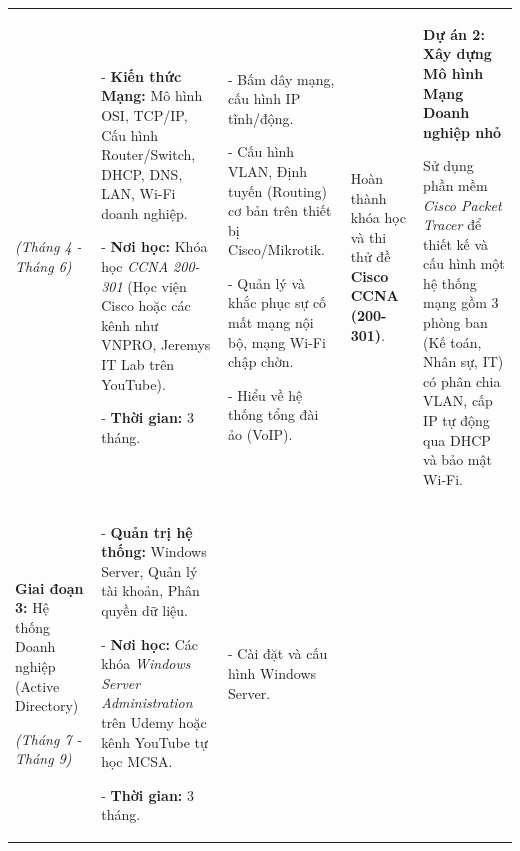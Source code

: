 \documentclass[
]{article}
\begin{document}
\begin{longtable}[]{@{}lllll@{}}
\begin{minipage}[t]{0.17\columnwidth}
\emph{(Tháng 4 - Tháng 6)}\strut
\end{minipage} & \begin{minipage}[t]{0.17\columnwidth}\raggedright
- \textbf{Kiến thức Mạng:} Mô hình OSI, TCP/IP, Cấu hình Router/Switch,
DHCP, DNS, LAN, Wi-Fi doanh nghiệp.

- \textbf{Nơi học:} Khóa học \emph{CCNA 200-301} (Học viện Cisco hoặc
các kênh như VNPRO, Jeremys IT Lab trên YouTube).

- \textbf{Thời gian:} 3 tháng.\strut
\end{minipage} & \begin{minipage}[t]{0.17\columnwidth}\raggedright
- Bấm dây mạng, cấu hình IP tĩnh/động.

- Cấu hình VLAN, Định tuyến (Routing) cơ bản trên thiết bị
Cisco/Mikrotik.

- Quản lý và khắc phục sự cố mất mạng nội bộ, mạng Wi-Fi chập chờn.

- Hiểu về hệ thống tổng đài ảo (VoIP).\strut
\end{minipage} & \begin{minipage}[t]{0.17\columnwidth}\raggedright
Hoàn thành khóa học và thi thử đề \textbf{Cisco CCNA (200-301)}.\strut
\end{minipage} & \begin{minipage}[t]{0.17\columnwidth}\raggedright
\textbf{Dự án 2: Xây dựng Mô hình Mạng Doanh nghiệp nhỏ}

Sử dụng phần mềm \emph{Cisco Packet Tracer} để thiết kế và cấu hình một
hệ thống mạng gồm 3 phòng ban (Kế toán, Nhân sự, IT) có phân chia VLAN,
cấp IP tự động qua DHCP và bảo mật Wi-Fi.\strut
\end{minipage}\tabularnewline
\begin{minipage}[t]{0.17\columnwidth}\raggedright
\textbf{Giai đoạn 3:} Hệ thống Doanh nghiệp (Active Directory)

\emph{(Tháng 7 - Tháng 9)}\strut
\end{minipage} & \begin{minipage}[t]{0.17\columnwidth}\raggedright
- \textbf{Quản trị hệ thống:} Windows Server, Quản lý tài khoản, Phân
quyền dữ liệu.

- \textbf{Nơi học:} Các khóa \emph{Windows Server Administration} trên
Udemy hoặc kênh YouTube tự học MCSA.

- \textbf{Thời gian:} 3 tháng.\strut
\end{minipage} & \begin{minipage}[t]{0.17\columnwidth}\raggedright
- Cài đặt và cấu hình Windows Server.


\end{minipage}
\end{longtable}
\end{document}
